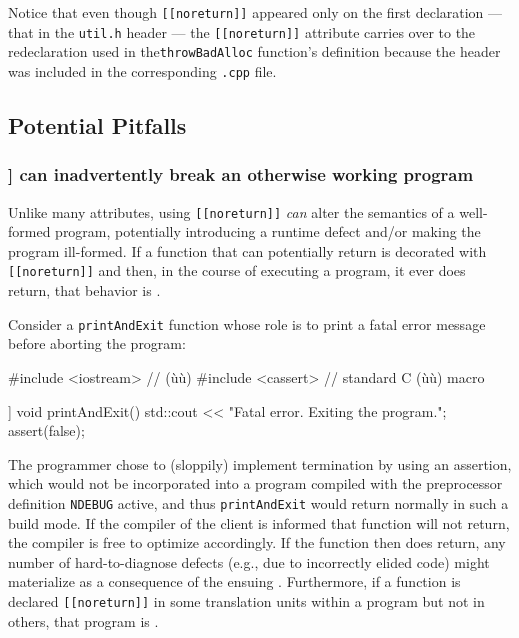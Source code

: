 \noindent Notice that even though \lstinline![[noreturn]]! appeared only on the first
declaration --- that in the \lstinline!util.h! header --- the \lstinline![[noreturn]]!
attribute carries over to the redeclaration used in the\linebreak[4] \lstinline!throwBadAlloc!
function's definition because the header was included in the
corresponding \lstinline!.cpp! file.

\subsection[Potential Pitfalls]{Potential Pitfalls}\label{noreturn-potential-pitfalls}

\subsubsection[\tt{[[noreturn]]} can inadvertently break an otherwise working program]{{\SubsubsecCode [[noreturn]]} can inadvertently break an otherwise working program}\label{[[noreturn]]-can-inadvertently-break-an-otherwise-working-program}

Unlike many attributes, using \lstinline![[noreturn]]! \emph{can} alter
the semantics of a well-formed program, potentially introducing a
runtime defect and/or making the program ill-formed. If a function that
can potentially return is decorated with \lstinline![[noreturn]]! and then,
in the course of executing a program, it ever does return, that behavior
is .

Consider a \lstinline!printAndExit! function whose role is to print a fatal
error message before aborting the program:

\begin{emcppshiddenlisting}[emcppsbatch=e5]
#include <iostream>  // (ù{}ù)
#include <cassert>   // standard C (ù{}ù) macro
\end{emcppshiddenlisting}
\begin{emcppslisting}[emcppsbatch=e5]
[[noreturn]] void printAndExit()
{
    std::cout << "Fatal error. Exiting the program.\n";
    assert(false);
}
\end{emcppslisting}

\noindent The programmer chose to (sloppily) implement termination by using an
assertion, which would not be incorporated into a program compiled with
the preprocessor definition \lstinline!NDEBUG! active, and thus
\lstinline!printAndExit! would return normally in such a build mode. If the
compiler of the client is informed that function will not return, the compiler is
free to optimize accordingly. If the function then does return, any
number of hard-to-diagnose defects (e.g., due to incorrectly elided
code) might materialize as a consequence of the ensuing
. Furthermore, if a function is declared \lstinline![[noreturn]]! in some
translation units within a program but not in others, that program is
.

